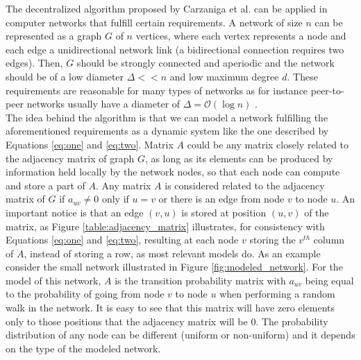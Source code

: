 \documentclass[a4paper,11pt,twoside]{report}
\begin{document}
The decentralized algorithm proposed by Carzaniga et al. \cite{6195806} can be applied in computer networks that fulfill certain requirements. A network of size $n$ can be represented as a graph $G$ of $n$ vertices, where each vertex represents a node and each edge a unidirectional network link (a bidirectional connection requires two edges). Then, $G$ should be strongly connected and aperiodic and the network should be of a low diameter $\varDelta << n$ and low maximum degree $d$. These requirements are reasonable for many types of networks as for instance peer-to-peer networks usually have a diameter of $\varDelta = \mathcal{O}(\log n)$ \cite{1258114}\cite{Rowstron:2001:PSD:646591.697650}\cite{Stoica:2001:CSP:964723.383071} \cite{citeulike:92971} \cite{Schlosser:2002:HHO:1756247.1756261} .\\

The idea behind the algorithm is that we can model a network fulfilling the aforementioned requirements as a dynamic system like the one described by Equations \ref{eq:one} and \ref{eq:two}. Matrix $A$ could be any matrix closely related to the adjacency matrix of graph $G$, as long as its elements can be produced by information held locally by the network nodes, so that each node can compute and store a part of $A$. Any matrix $A$ is considered related to the adjacency matrix of $G$ if $a_{uv} \ne 0$ only if $u=v$ or there is an edge from node $v$ to node $u$. An important notice is that an edge $(v,u)$ is stored at position $(u,v)$ of the matrix, as Figure \ref{table:adjacency_matrix} illustrates, for consistency with Equations \ref{eq:one} and \ref{eq:two}, resulting at each node $v$ storing the $v^{th}$ column of $A$, instead of storing a row, as most relevant models do. As an example consider the small network illustrated in Figure \ref{fig:modeled_network}. For the model of this network, $A$ is the transition probability matrix with $a_{uv}$ being equal to the probability of going from node $v$ to node $u$ when performing a random walk in the network. It is easy to see that this matrix will have zero elements only to those positions that the adjacency matrix will be 0. The probability distribution of any node can be different (uniform or non-uniform) and it depends on the type of the modeled network.\\
\end{document}
